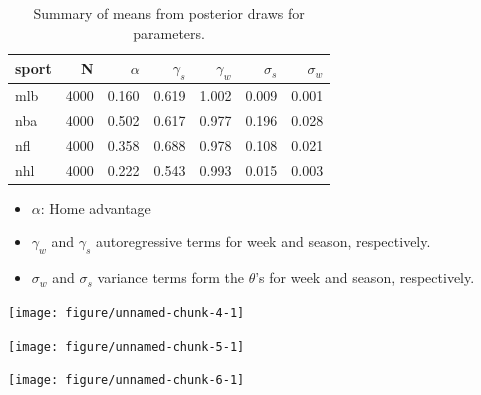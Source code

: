 \documentclass{beamer}\usepackage[]{graphicx}\usepackage[]{color}
\newenvironment{knitrout}{}{} %
\begin{document}
\begin{frame}[fragile]
\begin{table}[ht]
\centering
\begin{tabular}{lrrrrrr}
  \hline
sport & N & $\alpha$ & $\gamma_s$ & $\gamma_w$ & $\sigma_s$ & $\sigma_w$ \\ 
  \hline
mlb & 4000 & 0.160 & 0.619 & 1.002 & 0.009 & 0.001 \\ 
  nba & 4000 & 0.502 & 0.617 & 0.977 & 0.196 & 0.028 \\ 
  nfl & 4000 & 0.358 & 0.688 & 0.978 & 0.108 & 0.021 \\ 
  nhl & 4000 & 0.222 & 0.543 & 0.993 & 0.015 & 0.003 \\ 
   \hline
\end{tabular}
\caption{Summary of means from posterior draws for parameters.} 
\label{tab:params}
\end{table}

\begin{itemize}
\item $\alpha$: Home advantage
\item $\gamma_w$ and $\gamma_s$ autoregressive terms for week and season, respectively.
\item $\sigma_w$ and $\sigma_s$ variance terms form the $\theta$'s for week and season, respectively.  
\end{itemize}
\end{frame}

\begin{frame}[fragile]
\begin{knitrout}
\color{fgcolor}
\texttt{[image: figure/unnamed-chunk-4-1]} 

\end{knitrout}
\end{frame}

\begin{frame}[fragile]
\begin{knitrout}
\color{fgcolor}
\texttt{[image: figure/unnamed-chunk-5-1]} 

\end{knitrout}
\end{frame}

\begin{frame}[fragile]
\begin{knitrout}
\color{fgcolor}
\texttt{[image: figure/unnamed-chunk-6-1]} 

\end{knitrout}
\end{frame}
\end{document}
